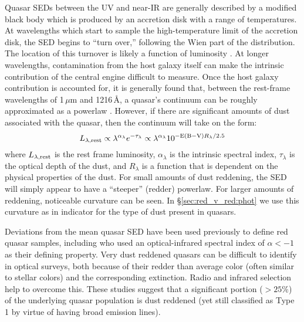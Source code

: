 Quasar SEDs between the UV and near-IR are generally described by a modified black body \citep{Shakura:1973} which is produced by an accretion disk with a range of temperatures.  At wavelengths which start to sample the high-temperature limit of the accretion disk, the SED begins to ``turn over,'' following the Wien part of the distribution.  The location of this turnover is likely a function of luminosity \citep[e.g., ][]{Brotherton:1999,Scott:2004}. At longer wavelengths, contamination from the host galaxy itself can make the intrinsic contribution of the central engine difficult to measure. Once the host galaxy contribution is accounted for, it is generally found that, between the rest-frame wavelengths of 1\,$\mu$m and 1216\,\AA, a quasar's continuum can be roughly approximated as a powerlaw \citep[e.g., ][]{Vanden-Berk:2001,Richards:2006,Krawczyk:2013}. However, if there are significant amounts of dust associated with the quasar, then the continuum will take on the form:
\begin{equation} \label{eqn:red_eq} 
L_{\lambda,{\rm rest}} \propto \lambda^{\alpha_\lambda} e^{-\tau_\lambda} \propto \lambda^{\alpha_\lambda} 10^{-{\rm E(B-V)}R_{\lambda}/2.5} 
\end{equation}
where $L_{\lambda,{\rm rest}}$ is the rest frame luminosity, $\alpha_\lambda$ is the intrinsic spectral index, $\tau_\lambda$ is the optical depth of the dust, and $R_{\lambda}$ is a function that is dependent on the physical properties of the dust.  For small amounts of dust reddening, the SED will simply appear to have a ``steeper'' (redder) powerlaw.  For larger amounts of reddening, noticeable curvature can be seen.  In \S\ref{sec:red_v_red:phot} we use this curvature as in indicator for the type of dust present in quasars.

Deviations from the mean quasar SED have been used previously to define red quasar samples, including \citet{Gregg:2002} who used an optical-infrared spectral index of $\alpha<-1$ as their defining property. Very dust reddened quasars can be difficult to identify in optical surveys, both because of their redder than average color (often similar to stellar colors) and the corresponding extinction. Radio and infrared selection \citep[e.g., ][]{Gregg:2002,Glikman:2007} help to overcome this. These studies suggest that a significant portion ($>25\%$) of the underlying quasar population is dust reddened (yet still classified as Type 1 by virtue of having broad emission lines).


